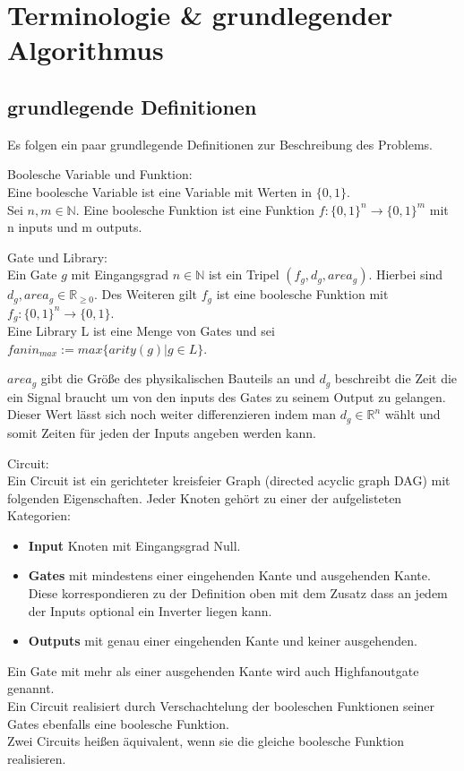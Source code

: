 \documentclass[11pt, a4paper, german]{article}
\begin{document}
\section{Terminologie \& grundlegender Algorithmus}
\subsection{grundlegende Definitionen}
Es folgen ein paar grundlegende Definitionen zur Beschreibung des Problems.

\begin{definition}{Boolesche Variable und Funktion: } \\
Eine boolesche Variable ist eine Variable mit Werten in $ \{ 0 , 1 \} $. \\
Sei $ n, m \in \mathbb{N}$. Eine boolesche Funktion ist eine Funktion $ f : \{ 0 , 1 \}^n \rightarrow \{ 0 , 1 \}^m $ mit n inputs und m outputs. 
\end{definition}

\begin{definition}{Gate und Library:}\\
Ein Gate $g$ mit Eingangsgrad $ n \in \mathbb{N}$ ist ein Tripel $(f_g, d_g, area_g)$. Hierbei sind $d_g, area_g \in \mathbb{R}_{\geq 0}$. Des Weiteren gilt $f_g$ ist eine boolesche Funktion mit $ f_g : \{0,1\}^n \rightarrow \{0, 1\} $. \\
Eine Library L ist eine Menge von Gates und sei $fanin_{max} := max\{ arity(g) | g \in L \}$.
\end{definition}
$area_g$ gibt die Größe des physikalischen Bauteils an und $d_g$ beschreibt die Zeit die ein Signal braucht um von den inputs des Gates zu seinem Output zu gelangen. Dieser Wert lässt sich noch weiter differenzieren indem man $d_g \in \mathbb{R}^n$ wählt und somit Zeiten für jeden der Inputs angeben werden kann. 

\begin{definition}{Circuit:}\\
Ein Circuit ist ein gerichteter kreisfeier Graph (directed acyclic graph DAG) mit folgenden Eigenschaften. Jeder Knoten gehört zu einer der aufgelisteten Kategorien: 
\begin{itemize}
\item{\bf Input} Knoten mit Eingangsgrad Null.
\item{\bf Gates} mit mindestens einer eingehenden Kante und ausgehenden Kante. Diese korrespondieren zu der Definition oben mit dem Zusatz dass an jedem der Inputs optional ein Inverter liegen kann.
\item{\bf Outputs} mit genau einer eingehenden Kante und keiner ausgehenden.
\end{itemize}
Ein Gate mit mehr als einer ausgehenden Kante wird auch Highfanoutgate genannt.\\
Ein Circuit realisiert durch Verschachtelung der booleschen Funktionen seiner Gates ebenfalls eine boolesche Funktion. \\
Zwei Circuits heißen äquivalent, wenn sie die gleiche boolesche Funktion realisieren.
\end{definition}
\end{document}
